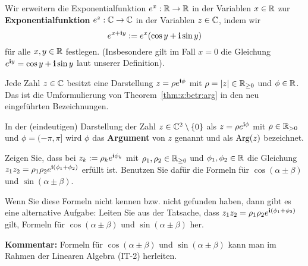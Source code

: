 \begin{defn}
	\label{def:euler:formel}
	Wir erweitern die Exponentialfunktion $e^x : \mathbb{R} \to \mathbb{R}$ in der Variablen $x \in \mathbb{R}$ zur \textbf{Exponentialfunktion} $e^z : \mathbb{C} \to \mathbb{C}$ in der Variablen $z \in \mathbb{C}$, indem wir 
	\[
			e^{x+ \mathbf{i} y} := e^x ( \cos y + \mathbf{i} \sin y)
	\]
	für alle $x, y \in \mathbb{R}$ festlegen. (Insbesondere gilt im Fall $x=0$ die Gleichung $e^{\mathbf{i} y} = \cos y + \mathbf{i} \sin y$ laut unserer Definition). 
\end{defn} 

\begin{bem}
	Jede Zahl $z \in \mathbb{C}$ besitzt eine Darstellung $z = \rho e^{\mathbf{i} \phi}$ mit $\rho = |z| \in \mathbb{R}_{\ge 0}$ und $\phi \in \mathbb{R}$. Das ist die Umformulierung von Theorem~\ref{thm:z:betr:arg} in den neu eingeführten Bezeichnungen. 
\end{bem} 

\begin{defn} 
	In der (eindeutigen) Darstellung  der Zahl $z \in \mathbb{C}^2 \setminus \{0\}$ als $z = \rho e^{\mathbf{i} \phi}$ mit $\rho \in \mathbb{R}_{>0}$ und $\phi = (-\pi,\pi]$  wird $\phi$ das \textbf{Argument} von $z$ genannt und als $\operatorname{Arg}(z)$ bezeichnet. 
\end{defn} 

\begin{aufg}
	Zeigen Sie, dass bei $z_k := \rho_k e^{\mathbf{i} \phi_k}$ mit $\rho_1,\rho_2 \in \mathbb{R}_{\ge 0}$ und $\phi_1,\phi_2 \in \mathbb{R}$ die Gleichung $z_1 z_2 =  \rho_1 \rho_2 e^{\mathbf{i} (\phi_1 + \phi_2)}$ erfüllt ist.  Benutzen Sie dafür die Formeln für $\cos(\alpha \pm \beta)$ und $\sin(\alpha \pm \beta)$. 
	
	Wenn Sie diese Formeln nicht kennen bzw. nicht gefunden haben, dann gibt es eine alternative Aufgabe: Leiten Sie aus der Tatsache, dass $z_1 z_2 = \rho_1 \rho_2 e^{\mathbf{i}(\phi_1 + \phi_2)}$ gilt, Formeln für $\cos(\alpha \pm \beta)$ und $\sin(\alpha \pm \beta)$ her. 
	
	\textbf{Kommentar:} Formeln für $\cos(\alpha \pm \beta)$ und $\sin(\alpha \pm \beta)$ kann man im Rahmen der Linearen Algebra (IT-2) herleiten. 
\end{aufg} 

